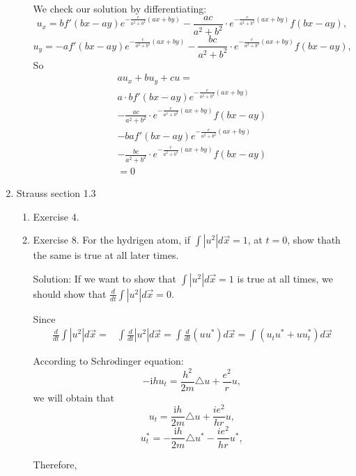 \documentclass{article}
\begin{document}
\begin{enumerate}
\begin{enumerate}
		We check our solution by differentiating:
		\[u_x= b f'(bx-ay)e^{-\frac{c}{a^2+b^2}(ax+by)} -\frac{ac}{a^2+b^2} \cdot e^{-\frac{c}{a^2+b^2}(ax+by)}f(bx-ay),\]
		\[u_y= -a f'(bx-ay)e^{-\frac{c}{a^2+b^2}(ax+by)} -\frac{bc}{a^2+b^2} \cdot e^{-\frac{c}{a^2+b^2}(ax+by)}f(bx-ay),\]
		So
		\begin{align*}
			au_x+bu_y+cu= \\
			a\cdot b f'(bx-ay)e^{-\frac{c}{a^2+b^2}(ax+by)} \\
			-\frac{ac}{a^2+b^2} \cdot e^{-\frac{c}{a^2+b^2}(ax+by)}f(bx-ay) \\
			-b a f'(bx-ay)e^{-\frac{c}{a^2+b^2}(ax+by)} \\
			-\frac{bc}{a^2+b^2} \cdot e^{-\frac{c}{a^2+b^2}(ax+by)}f(bx-ay) \\
			= 0
		\end{align*}
	\end{enumerate}
\item Strauss section 1.3
	\begin{enumerate}
		\item Exercise 4.
		\item Exercise 8. For the hydrigen atom, if $ \int \left | u^2 \right | d \vec{x } =1$, at $t=0$, show thath the same is true at all later times.
		
		Solution: If we want to show that $ \int \left | u^2 \right | d \vec{x } =1$ is true at all times, we should show that $\frac{d}{dt}\int \left | u^2 \right | d \vec{x } =0$.
                  
		Since
		\begin{align*}
			 \frac{d}{dt}\int \left | u^2 \right | d \vec{x } =&
			 \int \frac{d}{dt} \left | u^2 \right | d \vec{x }=
			 \int \frac{d}{dt} \left(uu^* \right)d \vec{x }=
			 \int\left(  u_{t}u^*+uu_{t}^*\right) d \vec{x }
		\end{align*}

		According to Schr$\ddot{o}$dinger equation: 
		\[-\mathrm{i}hu_{t}=\frac{h^2}{2m}\triangle u+ \frac{e^2}{r}u,\]
		we will obtain that
		\[u_{t}=\frac{\mathrm{i}h}{2m}\triangle u+ \frac{ie^2}{hr}u,\]
		\[u_{t}^*=-\frac{\mathrm{i}h}{2m}\triangle u^*-\frac{ie^2}{hr}u^*,\]

		Therefore,


\end{enumerate}
\end{enumerate}
\end{document}
